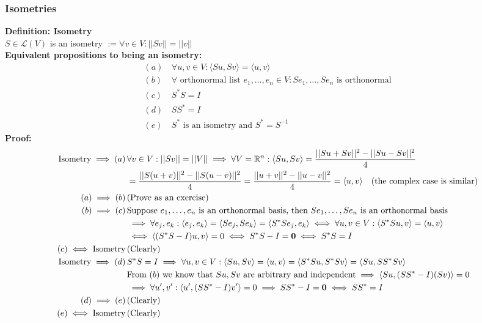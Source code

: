 \documentclass{article}
\newcommand{\R}{\mathbb{R}}
\newcommand{\0}{{\bf{0}}}
\begin{document}
\subsubsection{Isometries}
\textbf{Definition: Isometry}\\
$S\in\mathcal{L}(V)$ is an isometry $:=\forall v\in V:||Sv||=||v||$\\
\textbf{Equivalent propositions to being an isometry:}
\begin{equation}
\begin{split}
    (a)\,&\forall u,v\in V:\langle Su,Sv\rangle=\langle u,v\rangle\\
    (b)\,&\forall\mbox{ orthonormal list }e_1,\dots,e_n\in V:Se_1,\dots,Se_n\mbox{ is orthonormal}\\
    (c)\,&S^*S=I\\
    (d)\,&SS^*=I\\
    (e)\,&S^*\mbox{ is an isometry and }S^*=S^{-1}
\end{split}
\end{equation}
\textbf{Proof:}
\begin{equation}
\begin{split}
    \mbox{Isometry}\implies(a)\,&\forall v\in V:||Sv||=||V||\implies\forall V=\R^n:\langle Su,Sv\rangle=\frac{||Su+Sv||^2-||Su-Sv||^2}{4}\\
    &=\frac{||S(u+v)||^2-||S(u-v)||^2}{4}=\frac{||u+v||^2-||u-v||^2}{4}=\langle u,v\rangle\quad(\mbox{the complex case is similar})\\
    (a)\implies(b)\,&(\mbox{Prove as an exercise})\\
    (b)\implies(c)\,&\mbox{Suppose }e_1,\dots,e_n\mbox{ is an orthonormal basis, then }Se_1,\dots,Se_n\mbox{ is an orthonormal basis}\\
    &\implies\forall e_j,e_k:\langle e_j,e_k\rangle=\langle Se_j,Se_k\rangle=\langle S^*Se_j,e_k\rangle\iff\forall u,v\in V:\langle S^*Su,v\rangle=\langle u,v\rangle\\
    &\iff\langle(S^*S-I)u,v\rangle=0\iff S^*S-I=\0\iff S^*S=I\\
    (c)\iff\mbox{Isometry}\,&(\mbox{Clearly})\\
    \mbox{Isometry}\implies(d)\,&S^*S=I\implies\forall u,v\in V:\langle Su,Sv\rangle=\langle u,v\rangle=\langle S^*Su,S^*Sv\rangle=\langle Su,SS^*Sv\rangle\\
    &\mbox{From }(b)\mbox{ we know that }Su,Sv\mbox{ are arbitrary and independent}\implies\langle Su,(SS^*-I)(Sv)\rangle=0\\
    &\implies\forall u',v':\langle u',(SS^*-I)v'\rangle=0\implies SS^*-I=\0\iff SS^*=I\\
    (d)\implies(e)\,&\mbox{(Clearly)}\\
    (e)\iff\mbox{Isometry}\,&\mbox{(Clearly)}
\end{split}
\end{equation}
\end{document}
